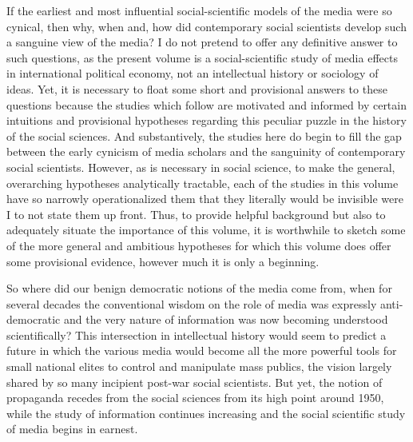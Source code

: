 \documentclass[12pt]{report}
\begin{document}
If the earliest and most influential social-scientific models of the
media were so cynical, then why, when and, how did contemporary social
scientists develop such a sanguine view of the media? I do not pretend
to offer any definitive answer to such questions, as the present volume
is a social-scientific study of media effects in international political
economy, not an intellectual history or sociology of ideas. Yet, it
is necessary to float some short and provisional answers to these
questions because the studies which follow are motivated and informed
by certain intuitions and provisional hypotheses regarding this peculiar
puzzle in the history of the social sciences. And substantively, the
studies here do begin to fill the gap between the early cynicism of
media scholars and the sanguinity of contemporary social scientists.
However, as is necessary in social science, to make the general, overarching
hypotheses analytically tractable, each of the studies in this volume
have so narrowly operationalized them that they literally would be
invisible were I to not state them up front. Thus, to provide helpful
background but also to adequately situate the importance of this volume,
it is worthwhile to sketch some of the more general and ambitious
hypotheses for which this volume does offer some provisional evidence,
however much it is only a beginning.

So where did our benign democratic notions of the media come from,
when for several decades the conventional wisdom on the role of media
was expressly anti-democratic and the very nature of information was
now becoming understood scientifically? This intersection in intellectual
history would seem to predict a future in which the various media
would become all the more powerful tools for small national elites
to control and manipulate mass publics, the vision largely shared
by so many incipient post-war social scientists. But yet, the notion
of propaganda recedes from the social sciences from its high point
around 1950, while the study of information continues increasing and
the social scientific study of media begins in earnest. 
\end{document}

